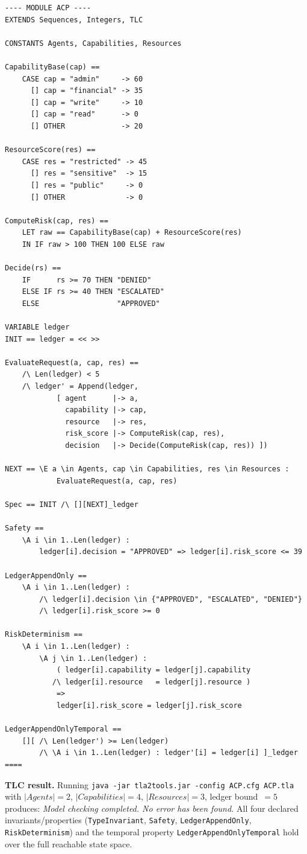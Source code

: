 \documentclass[11pt]{article}
\theoremstyle{definition}
\begin{document}
\begin{verbatim}
---- MODULE ACP ----
EXTENDS Sequences, Integers, TLC

CONSTANTS Agents, Capabilities, Resources

CapabilityBase(cap) ==
    CASE cap = "admin"     -> 60
      [] cap = "financial" -> 35
      [] cap = "write"     -> 10
      [] cap = "read"      -> 0
      [] OTHER             -> 20

ResourceScore(res) ==
    CASE res = "restricted" -> 45
      [] res = "sensitive"  -> 15
      [] res = "public"     -> 0
      [] OTHER              -> 0

ComputeRisk(cap, res) ==
    LET raw == CapabilityBase(cap) + ResourceScore(res)
    IN IF raw > 100 THEN 100 ELSE raw

Decide(rs) ==
    IF      rs >= 70 THEN "DENIED"
    ELSE IF rs >= 40 THEN "ESCALATED"
    ELSE                  "APPROVED"

VARIABLE ledger
INIT == ledger = << >>

EvaluateRequest(a, cap, res) ==
    /\ Len(ledger) < 5
    /\ ledger' = Append(ledger,
            [ agent      |-> a,
              capability |-> cap,
              resource   |-> res,
              risk_score |-> ComputeRisk(cap, res),
              decision   |-> Decide(ComputeRisk(cap, res)) ])

NEXT == \E a \in Agents, cap \in Capabilities, res \in Resources :
            EvaluateRequest(a, cap, res)

Spec == INIT /\ [][NEXT]_ledger

Safety ==
    \A i \in 1..Len(ledger) :
        ledger[i].decision = "APPROVED" => ledger[i].risk_score <= 39

LedgerAppendOnly ==
    \A i \in 1..Len(ledger) :
        /\ ledger[i].decision \in {"APPROVED", "ESCALATED", "DENIED"}
        /\ ledger[i].risk_score >= 0

RiskDeterminism ==
    \A i \in 1..Len(ledger) :
        \A j \in 1..Len(ledger) :
            ( ledger[i].capability = ledger[j].capability
           /\ ledger[i].resource   = ledger[j].resource )
            =>
            ledger[i].risk_score = ledger[j].risk_score

LedgerAppendOnlyTemporal ==
    [][ /\ Len(ledger') >= Len(ledger)
        /\ \A i \in 1..Len(ledger) : ledger'[i] = ledger[i] ]_ledger
====
\end{verbatim}

\noindent\textbf{TLC result.}
Running \texttt{java -jar tla2tools.jar -config ACP.cfg ACP.tla} with
$|\mathit{Agents}|=2$, $|\mathit{Capabilities}|=4$, $|\mathit{Resources}|=3$,
ledger bound~$=5$ produces:
\textit{Model checking completed. No error has been found.}
All four declared invariants/properties (\texttt{TypeInvariant}, \texttt{Safety},
\texttt{LedgerAppendOnly}, \texttt{RiskDeterminism}) and the temporal property
\texttt{LedgerAppendOnlyTemporal} hold over the full reachable state space.
\end{document}
